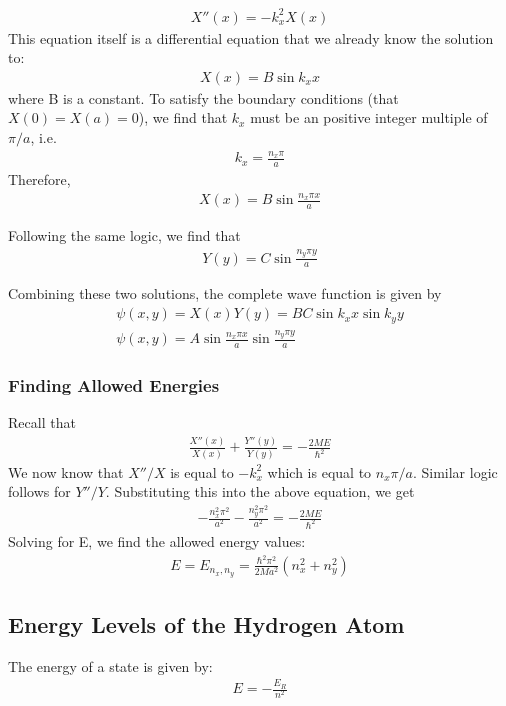 \documentclass[10pt]{article}
\begin{document}
\begin{align}
    X''(x) = -k_x^2 X(x)
\end{align}
This equation itself is a differential equation that we already know the solution to:
\begin{align}
    X(x) = B \sin k_x x
\end{align}
where B is a constant. To satisfy the boundary conditions (that $X(0)=X(a) = 0$), we find that $k_x$ must be an positive integer multiple of $\pi/a$, i.e.
\begin{align}
    k_x = \frac{n_x \pi}{a}
\end{align}
Therefore,
\begin{align}
    X(x) = B \sin \frac{n_x \pi x}{a}
\end{align}

Following the same logic, we find that
\begin{align}
    Y(y) = C \sin \frac{n_y \pi y}{a}
\end{align}

Combining these two solutions, the complete wave function is given by 
\begin{gather}
    \psi(x, y) = X(x)Y(y) = BC \sin k_x x \sin k_y y \\
    \psi(x, y) = A \sin \frac{n_x \pi x}{a} \sin \frac{n_y \pi y}{a}
\end{gather}

\subsubsection{Finding Allowed Energies}
Recall that 
\begin{align}
    \frac{X''(x)}{X(x)} + \frac{Y''(y)}{Y(y)} = - \frac{2ME}{\hbar^2}
\end{align}
We now know that $X''/X$ is equal to $-k_x^2$ which is equal to $n_x \pi /a$. Similar logic follows for $Y''/Y$. Substituting this into the above equation, we get
\begin{align}
    - \frac{n_x^2 \pi^2}{a^2} - \frac{n_y^2 \pi^2}{a^2} = - \frac{2ME}{\hbar^2}
\end{align}
Solving for E, we find the allowed energy values:
\begin{align}
    E = E_{n_x, n_y} = \frac{\hbar^2 \pi^2}{2Ma^2} (n_x^2 + n_y^2)
\end{align}



\subsection{Energy Levels of the Hydrogen Atom}
The energy of a state is given by:
\begin{align}
    E = - \frac{E_R}{n^2}
\end{align}
\end{document}
